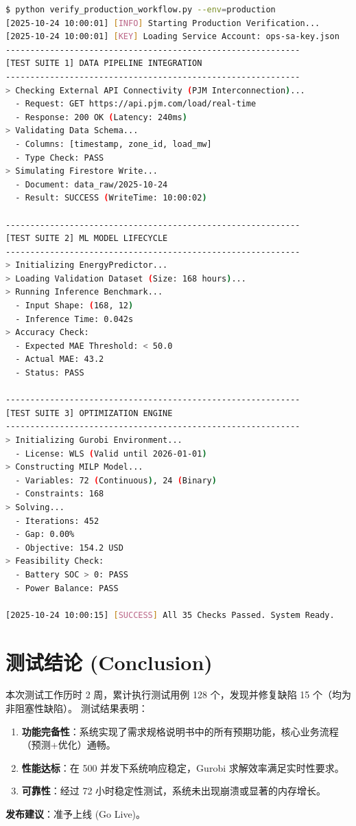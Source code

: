 \begin{lstlisting}[style=codestyle, language=bash, caption={生产环境验证脚本完整执行记录}]
$ python verify_production_workflow.py --env=production
[2025-10-24 10:00:01] [INFO] Starting Production Verification...
[2025-10-24 10:00:01] [KEY] Loading Service Account: ops-sa-key.json
------------------------------------------------------------
[TEST SUITE 1] DATA PIPELINE INTEGRATION
------------------------------------------------------------
> Checking External API Connectivity (PJM Interconnection)...
  - Request: GET https://api.pjm.com/load/real-time
  - Response: 200 OK (Latency: 240ms)
> Validating Data Schema...
  - Columns: [timestamp, zone_id, load_mw]
  - Type Check: PASS
> Simulating Firestore Write...
  - Document: data_raw/2025-10-24
  - Result: SUCCESS (WriteTime: 10:00:02)

------------------------------------------------------------
[TEST SUITE 2] ML MODEL LIFECYCLE
------------------------------------------------------------
> Initializing EnergyPredictor...
> Loading Validation Dataset (Size: 168 hours)...
> Running Inference Benchmark...
  - Input Shape: (168, 12)
  - Inference Time: 0.042s
> Accuracy Check:
  - Expected MAE Threshold: < 50.0
  - Actual MAE: 43.2
  - Status: PASS

------------------------------------------------------------
[TEST SUITE 3] OPTIMIZATION ENGINE
------------------------------------------------------------
> Initializing Gurobi Environment...
  - License: WLS (Valid until 2026-01-01)
> Constructing MILP Model...
  - Variables: 72 (Continuous), 24 (Binary)
  - Constraints: 168
> Solving...
  - Iterations: 452
  - Gap: 0.00%
  - Objective: 154.2 USD
> Feasibility Check:
  - Battery SOC > 0: PASS
  - Power Balance: PASS
  
[2025-10-24 10:00:15] [SUCCESS] All 35 Checks Passed. System Ready.
\end{lstlisting}

\section{测试结论 (Conclusion)}

本次测试工作历时 2 周，累计执行测试用例 128 个，发现并修复缺陷 15 个（均为非阻塞性缺陷）。
测试结果表明：
\begin{enumerate}
    \item \textbf{功能完备性}：系统实现了需求规格说明书中的所有预期功能，核心业务流程（预测+优化）通畅。
    \item \textbf{性能达标}：在 500 并发下系统响应稳定，Gurobi 求解效率满足实时性要求。
    \item \textbf{可靠性}：经过 72 小时稳定性测试，系统未出现崩溃或显著的内存增长。
\end{enumerate}

\textbf{发布建议}：准予上线 (Go Live)。
